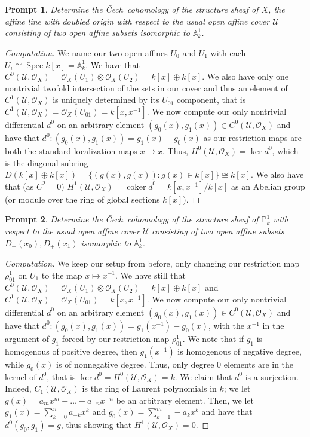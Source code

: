 \documentclass[english,letter,doublesided]{article}
\DeclareMathOperator{\spec}{Spec}
\renewcommand{\AA}{\mathbb{A}}
\newcommand{\OO}{\mathcal{O}}
\newcommand{\PP}{\mathbb{P}}
\newcommand{\prob}[1]{\setcounter{section}{#1-1}\section{}}
\newcommand{\prt}[1]{\setcounter{subsection}{#1-1}\subsection{}}
\newtheorem*{prompt*}{Prompt}
\theoremstyle{remark}
\theoremstyle{definition}
\DeclareMathOperator{\coker}{coker}
\newcommand{\cech}{\v Cech~}
\newcommand{\ucal}{{ \mathcal{U}}}
\begin{document}
	\prob{5}
\prt{1} \begin{prompt*}
Determine the \cech cohomology of the structure sheaf of $X$, the affine line with doubled origin with respect to the usual open affine cover $\ucal$ consisting of two open affine subsets isomorphic to $\AA^1_k$.
\end{prompt*}
\begin{proof}[Computation]
We name our two open affines $U_0$ and $U_1$ with each $U_i\cong \spec k[x]=\AA^1_k$. We have that $C^0(\ucal,\OO_X)=\OO_X(U_1)\otimes \OO_X(U_2)=k[x]\oplus k[x]$. We also have only one nontrivial twofold intersection of the sets in our cover and thus an element of $C^1(\ucal,\OO_X)$ is uniquely determined by its $U_{01}$ component, that is $C^1(\ucal,\OO_X)=\OO_X(U_{01})=k[x,x^{-1}]$. We now compute our only nontrivial differential $d^0$ on an arbitrary element $(g_0(x),g_1(x))\in C^0(\ucal,\OO_X)$ and have that $d^0:(g_0(x),g_1(x))=g_1(x)-g_0(x)$ as our restriction maps are both the standard localization maps $x\mapsto x$. Thus, $H^0(\ucal,\OO_X)=\ker d^0$, which is the diagonal subring $D(k[x]\oplus k[x])=\{(g(x),g(x)): g(x)\in k[x]\}\cong k[x]$. We also have that (as $C^2=0$) $H^1(\ucal, \OO_X)=\coker d^0=k[x,x^{-1}]/k[x]$ as an Abelian group (or module over the ring of global sections $k[x]$). \end{proof}
\begin{prompt*}
	Determine the \cech cohomology of the structure sheaf of $\PP^1_k$ with respect to the usual open affine cover $\ucal$ consisting of two open affine subsets $D_+(x_0),D_+(x_1)$ isomorphic to $\AA^1_k$.
\end{prompt*}
\begin{proof}[Computation]
	We keep our setup from before, only changing our restriction map $\rho_{01}^1$ on $U_1$ to the map $x\mapsto x^{-1}$. We have still that $C^0(\ucal,\OO_X)=\OO_X(U_1)\otimes \OO_X(U_2)=k[x]\oplus k[x]$ and $C^1(\ucal,\OO_X)=\OO_X(U_{01})=k[x,x^{-1}]$. We now compute our only nontrivial differential $d^0$ on an arbitrary element $(g_0(x),g_1(x))\in C^0(\ucal,\OO_X)$ and have that $d^0:(g_0(x),g_1(x))=g_1(x^{-1})-g_0(x)$, with the $x^{-1}$ in the argument of $g_1$ forced by our restriction map $\rho_{01}^1$. We note that if $g_1$ is homogenous of positive degree, then $g_1(x^{-1})$ is homogenous of negative degree, while $g_0(x)$ is of nonnegative degree. Thus, only degree 0 elements are in the kernel of $d^0$, that is $\ker d^0=H^0(\ucal,\OO_X)=k$. We claim that $d^0$ is a surjection. Indeed, $C_1(\ucal,\OO_X)$ is the ring of Laurent polynomials in $k$; we let $g(x)=a_mx^m+\dots+a_{-n}x^{-n}$ be an arbitrary element. Then, we let $g_1(x)=\sum_{k=0}^na_{-k}x^k$ and $g_0(x)=\sum_{k=1}^m-a_{k}x^k$ and have that $d^0(g_0,g_1)=g$, thus showing that $H^1(\ucal, \OO_X)=0$. \end{proof}
\end{document}
